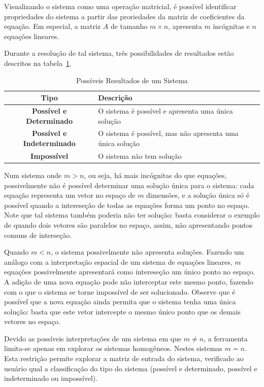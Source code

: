 \documentclass[a4paper,10pt]{report}
\begin{document}
Visualizando o sistema como uma operação matricial, é possível identificar propriedades do sistema a partir das proriedades da matriz de coeficientes da equação. Em especial, a matriz $A$ de tamanho $m \times n$, apresenta $m$ incógnitas e $n$ equações lineares.

Durante a resolução de tal sistema, três possibilidades de resultados estão descritos na tabela~\ref{tab:sistemas}.

\begin{table}[h]
\centering
\caption{Possíveis Resultados de um Sistema}
        \begin{tabular}{|c|p{2in}|}
        \hline
        \textbf{Tipo} & \textbf{Descrição} \\ \hline
        \textbf{Possível e Determinado} & O sistema é possível e apresenta uma única solução \\ \hline
        \textbf{Possível e Indeterminado} & O sistema é possível, mas não apresenta uma única solução \\ \hline
        \textbf{Impossível} & O sistema não tem solução \\ \hline
        \end{tabular}
\label{tab:sistemas}
\end{table} 

Num sistema onde $m > n$, ou seja, há mais incógnitas do que equações, possivelmente não é possível determinar uma solução única para o sistema: cada equação representa um vetor no espaço de $m$ dimensões, e a solução única só é possível quando a intereseção de todas as equações forma um ponto no espaço. Note que tal sistema também poderia não ter solução: basta considerar o exemplo de quando dois vetores são paralelos no espaço, assim, não apresentando pontos comuns de interseção.

Quando $m < n$, o sistema possivelmente não apresenta soluções. Fazendo um análogo com a interpretação espacial de um sistema de equações lineares, $m$ equações possivelmente apresentará como intereseção um único ponto no espaço. A adição de uma nova equação pode não interceptar este mesmo ponto, fazendo com o que o sistema se torne impossível de ser solucionado. Observe que é possível que a nova equação ainda permita que o sistema tenha uma única solução: basta que este vetor intercepte o mesmo único ponto que os demais vetores no espaço.

Devido as possíveis interpretações de um sistema em que $m \neq n$, a ferramenta limita-se apenas em explorar os sistemas homogêneos. Nestes sistemas $m = n$. Esta restrição permite explorar a matriz de entrada do sistema, verificado ao usuário qual a classificação do tipo do sistema (possível e determinado, possível e indeterminado ou impossível).
\end{document}
